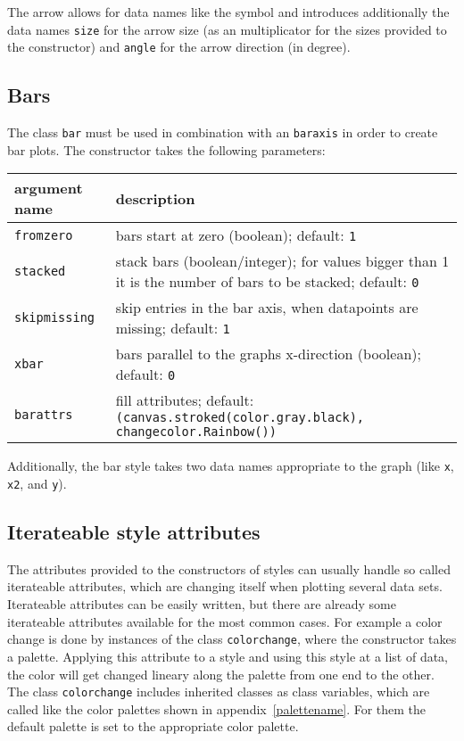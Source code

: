 The arrow allows for data names like the symbol and introduces
additionally the data names \verb|size| for the arrow size (as an
multiplicator for the sizes provided to the constructor) and
\verb|angle| for the arrow direction (in degree).

\subsection{Bars}

The class \verb|bar| must be used in combination with an
\verb|baraxis| in order to create bar plots. The constructor takes the
following parameters:

\medskip
\begin{tabularx}{\linewidth}{l>{\raggedright\arraybackslash}X}
argument name&description\\
\hline
\texttt{fromzero}&bars start at zero (boolean); default: \texttt{1}\\
\texttt{stacked}&stack bars (boolean/integer); for values bigger than 1 it is the number of bars to be stacked; default: \texttt{0}\\
\texttt{skipmissing}&skip entries in the bar axis, when datapoints are missing; default: \texttt{1}\\
\texttt{xbar}&bars parallel to the graphs x-direction (boolean); default: \texttt{0}\\
\texttt{barattrs}&fill attributes; default: \texttt{(canvas.stroked(color.gray.black), changecolor.Rainbow())}\\
\end{tabularx}

Additionally, the bar style takes two data names appropriate to the
graph (like \verb|x|, \verb|x2|, and \verb|y|).

\subsection{Iterateable style attributes}
\label{graph:changeattrs}

The attributes provided to the constructors of styles can usually
handle so called iterateable attributes, which are changing itself
when plotting several data sets. Iterateable attributes can be easily
written, but there are already some iterateable attributes available
for the most common cases. For example a color change is done by
instances of the class \verb|colorchange|, where the constructor takes
a palette. Applying this attribute to a style and using this style at
a list of data, the color will get changed lineary along the
palette from one end to the other. The class \verb|colorchange|
includes inherited classes as class variables, which are called like
the color palettes shown in appendix~\ref{palettename}. For them the
default palette is set to the appropriate color palette.


